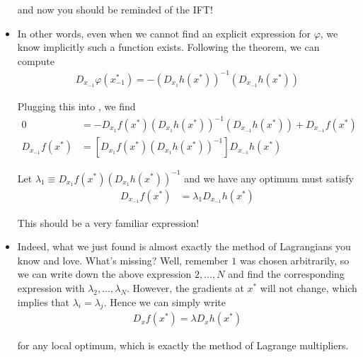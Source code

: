 \documentclass{article}
\begin{document}
\begin{itemize}[label=$\bullet$]
    and now you should be reminded of the IFT!

  \item In other words, even when we cannot find an explicit expression for $\varphi$, we know implicitly such a function exists. Following the theorem, we can compute
    \begin{align*}
      D_{x_{-1}} \varphi(x_{-1}^*) = - (D_{x_1} h(x^*))^{-1} (D_{x_{-1}} h(x^*))
    \end{align*}

    Plugging this into , we find
    \begin{align*}
      0
      &
      =
      - D_{x_1} f(x^*) (D_{x_1} h(x^*))^{-1} (D_{x_{-1}} h(x^*))
      +
      D_{x_{-1}} f(x^*)
      \\
      D_{x_{-1}} f(x^*)
      &
      =
      \left[
        D_{x_1} f(x^*) (D_{x_1} h(x^*))^{-1}
      \right]
      D_{x_{-1}} h(x^*)
    \end{align*}

    Let $\lambda_1 \equiv D_{x_1} f(x^*) (D_{x_1} h(x^*))^{-1}$ and we have any optimum must satisfy
    \begin{align*}
      D_{x_{-1}} f(x^*)
      &
      =
      \lambda_1 D_{x_{-1}} h(x^*)
    \end{align*}

    This should be a very familiar expression!

  \item Indeed, what we just found is almost exactly the method of Lagrangians you know and love. What's missing? Well, remember $1$ was chosen arbitrarily, so we can write down the above expression $2, \ldots, N$ and find the corresponding expression with $\lambda_2, \ldots, \lambda_N$. However, the gradients at $x^*$ will not  change, which implies that $\lambda_i = \lambda_j$. Hence we can simply write
    \begin{align*}
      D_x f(x^*)
      =
      \lambda D_x h(x^*)
    \end{align*}

    for any local optimum, which is exactly the method of Lagrange multipliers.
\end{itemize}

\end{document}
